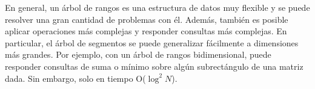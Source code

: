 En general, un árbol de rangos es una estructura de datos muy flexible y se puede resolver una gran cantidad de problemas con él. Además, también es posible aplicar operaciones más complejas y responder consultas más complejas. En particular, el árbol de segmentos se puede generalizar fácilmente a dimensiones más grandes. Por ejemplo, con un árbol de rangos bidimensional, puede responder consultas de suma o mínimo sobre algún subrectángulo de una matriz dada. Sin embargo, solo en tiempo O($\log^{2}N$).